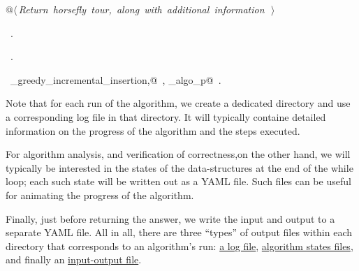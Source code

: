 \documentclass[11.5pt]{report}
\begin{document}
\begin{flushleft}
\begin{list}{}{}
\mbox{}\verb@      @\hbox{$\langle\,${\itshape Return horsefly tour, along with additional information}\nobreak\ {\footnotesize {}}$\,\rangle$}\verb@@\\
\mbox{}\verb@@{\NWsep}
\end{list}
\vspace{-1.5ex}
\footnotesize
\begin{list}{}{\setlength{\itemsep}{-\parsep}\setlength{\itemindent}{-\leftmargin}}
\item \NWtxtMacroDefBy\ .
\item \NWtxtMacroRefIn\ .
\item \NWtxtIdentsDefed\nobreak\  \verb@algo_greedy_incremental_insertion,@\nobreak\ , \verb@animate_algo_p@\nobreak\ .
\item{}
\end{list}
\vspace{4ex}
\end{flushleft}
\newchunk Note that for each run of the algorithm, we create a dedicated directory and 
use a corresponding log file  in that directory. It will typically containe detailed 
information on the progress of the algorithm and the steps executed. 

For algorithm analysis, and verification of correctness,on the other hand, we will 
typically  be interested in the states of the data-structures at the end of 
the while loop; each such state will be written out as a YAML file. Such files can 
be useful for animating the progress of the algorithm. 

Finally, just before returning the answer, we write the input and output 
to a separate YAML file. All in all, there are three ``types'' of output files
within each directory that corresponds to an algorithm's run: 
\underline{a log file}, \underline{algorithm states files}, and finally 
an \underline{input-output file}. 
\end{document}
